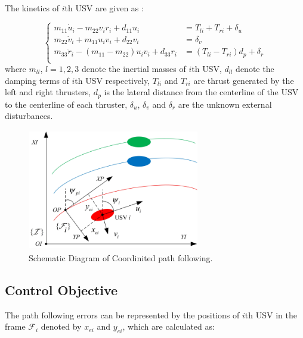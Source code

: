 \documentclass[conference,letterpaper,10.5pt]{IEEEtran}
\begin{document}
The kinetics of $i$th USV are given as \cite{bib13}:

\begin{equation}\label{kinetics}
	\left\{
	\begin{aligned}
		m_{11}\dot{u}_{i}-m_{22}v_{i}r_{i}+d_{11}u_{i}&=T_{li}+T_{ri}+\delta_{u}\\
		m_{22}\dot{v}_i+m_{11}u_iv_i+d_{22}v_{i}&=\delta_{v}\\
		m_{33}\dot{r}_i-(m_{11}-m_{22})u_iv_i+d_{33}r_i&=(T_{li}-T_{ri})d_p+\delta_r\\
	\end{aligned}
	\right.
\end{equation}
where $m_{ll}$, $l=1,2,3$ denote the inertial masses of $i$th USV, $d_{ll}$ denote the damping terms of $i$th USV respectively, $T_{li}$ and $T_{ri}$ are thrust generated by the left and right thrusters, $d_p$ is the lateral distance from the centerline of the USV to the centerline of each thruster, $\delta_u$, $\delta_v$ and $\delta_r$ are the unknown external disturbances.

\begin{figure}[!htb]
	\centering
	\includegraphics[width=7.5cm, height=5.3cm]{CPF.eps}
	\caption{Schematic Diagram of Coordinited path following. }
	\label{CPF}
\end{figure}

\subsection{Control Objective}
The path following errors can be represented by the positions of $i$th USV in the frame $\mathcal{F}_i$ denoted by $x_{ei}$ and $y_{ei}$, which are calculated as:
\end{document}
